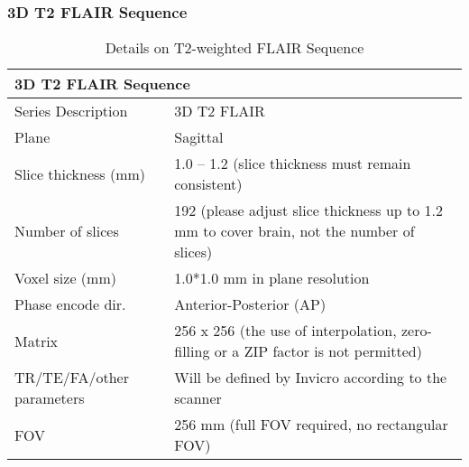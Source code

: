 \documentclass[
	a4paper, 
	11.5pt,
	headings=small, 
	twoside, 
	titlepage=firstiscover, 
 	pagesize=auto,
  	version=last,
	open=any,
	BCOR=14mm,
  	chapterprefix=false]{scrbook}
\begin{document}
\subsubsection{3D T2 \ac{FLAIR} Sequence}
\begin{table}[H]
\caption{Details on T2-weighted \ac{FLAIR} Sequence}
\begin{tabularx}{1\textwidth}{@{}X *{1}{X}@{}}
\toprule
\multicolumn{2}{l}{\textbf{3D T2 \ac{FLAIR} Sequence}} \\
\midrule                                                                                                                                                                                                                                                                                                                                                                                                                                                                                                                                                                                                                                                                                                                          
Series Description        							& 3D T2 FLAIR                                                                               \\
Plane                   	 		 					& Sagittal                                                                                  \\
Slice thickness (mm)      							& 1.0 – 1.2 (slice thickness must remain consistent)                                        \\
Number of slices          							& 192 (please adjust slice thickness up to 1.2 mm to cover brain, not the number of slices) \\
Voxel size (mm)           							& 1.0*1.0 mm in plane resolution                                                            \\
Phase encode dir.         							& Anterior-Posterior (AP)                                                                   \\
Matrix                    								& 256 x 256 (the use of interpolation, zero-filling or a ZIP factor is not permitted)       \\
TR/TE/FA/other parameters 					& Will be defined by Invicro according to the scanner                                       \\
FOV                       								& 256 mm (full FOV required, no rectangular FOV)                                            \\

\end{tabularx}
\end{table}
\end{document}
